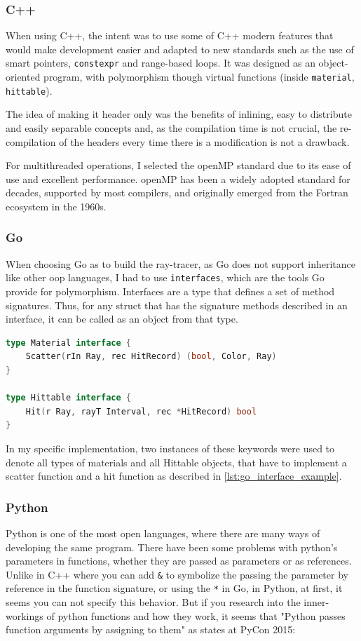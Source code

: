 \subsubsection{C++}
When using C++, the intent was to use some of C++ modern features that would make development easier and adapted to new standards such as the use of smart pointers, \texttt{constexpr} and range-based loops. It was designed as an object-oriented program, with polymorphism though virtual functions (inside \texttt{material}, \texttt{hittable}).

The idea of making it header only was the benefits of inlining, easy to distribute and easily separable concepts and, as the compilation time is not crucial, the re-compilation of the headers every time there is a modification is not a drawback.

For multithreaded operations, I selected the \gls{openMP} standard due to its ease of use and excellent performance. \gls{openMP} has been a widely adopted standard for decades, supported by most compilers, and originally emerged from the Fortran ecosystem in the 1960s.

\subsubsection{Go}
When choosing Go as to build the ray-tracer, as Go does not support inheritance like other \gls{oop} languages, I had to use \texttt{interfaces}, which are the tools Go provide for polymorphism. Interfaces are a type that defines a set of method signatures. Thus, for any struct that has the signature methods described in an interface, it can be called as an object from that type.

\begin{lstlisting}[language=Go, caption={Go interface example.}, label={lst:go_interface_example}
]
type Material interface {
	Scatter(rIn Ray, rec HitRecord) (bool, Color, Ray)
}

type Hittable interface {
	Hit(r Ray, rayT Interval, rec *HitRecord) bool
}
\end{lstlisting}

In my specific implementation, two instances of these keywords were used to denote all types of materials and all Hittable objects, that have to implement a scatter function and a hit function as described in \autoref{lst:go_interface_example}.

\subsubsection{Python}
Python is one of the most open languages, where there are many ways of developing the same program. There have been some problems with python's parameters in functions, whether they are passed as parameters or as references. Unlike in C++ where you can add \texttt{\&} to symbolize the passing the parameter by reference in the function signature, or using the \texttt{*} in Go, in Python, at first, it seems you can not specify this behavior. But if you research into the inner-workings of python functions and how they work, it seems that "Python passes function arguments by assigning to them" as \cite{python-names-pycon15} states at PyCon 2015:

